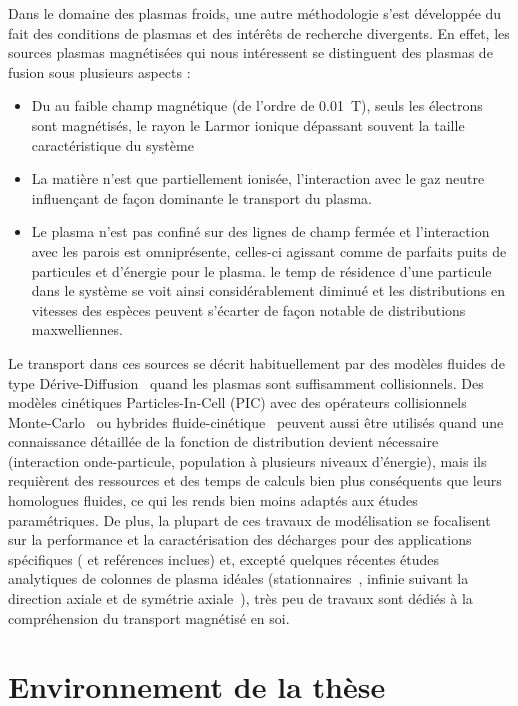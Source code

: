 \begin{refsection}
Dans le domaine des plasmas froids, une autre méthodologie s'est développée du
fait des conditions de plasmas et des intérêts de recherche
divergents. En effet, les sources plasmas magnétisées qui nous intéressent
se distinguent des plasmas de fusion sous plusieurs aspects :

\begin{itemize}
  \item Du au faible champ magnétique (de l'ordre de 0.01~T), seuls
  les électrons sont magnétisés, le rayon le Larmor ionique dépassant souvent la
  taille caractéristique du système
  \item La matière n'est que partiellement ionisée, l'interaction avec
  le gaz neutre influençant de façon dominante le transport du plasma.
  \item Le plasma n'est pas confiné sur des lignes de champ fermée et
  l'interaction avec les parois est omniprésente, celles-ci agissant comme de
  parfaits puits de particules et d'énergie pour le plasma.
  le temp de résidence d'une particule dans le système se voit
  ainsi considérablement diminué et les distributions en vitesses des
  espèces peuvent s'écarter de façon notable de distributions maxwelliennes.
\end{itemize}

Le transport dans ces sources se décrit habituellement par des modèles fluides
de type Dérive-Diffusion~\parencite{Porteous,Lieberman,Rozhansky} quand les
plasmas sont suffisamment collisionnels. Des modèles
cinétiques Particles-In-Cell (PIC) avec des opérateurs collisionnels
Monte-Carlo~\parencite{Claustre,Adam} ou hybrides
fluide-cinétique~\parencite{BoeufGarrigues} peuvent aussi être utilisés quand
une connaissance détaillée de la fonction de distribution devient nécessaire
(interaction onde-particule, population à plusieurs niveaux d'énergie), mais
ils requièrent des ressources et des temps de calculs bien plus conséquents que
leurs homologues fluides, ce qui les rends bien moins adaptés aux études
paramétriques. De plus, la plupart de ces travaux de modélisation se focalisent
sur la performance et la caractérisation des décharges pour des applications
spécifiques (\parencite{Lieberman} et reférences inclues) et, excepté quelques
récentes études analytiques de colonnes de plasma idéales
(stationnaires~\parencite{Sternberg}, infinie suivant la direction axiale et de
symétrie axiale~\parencite{Fruchtman}), très peu de travaux sont dédiés à la
compréhension du transport magnétisé en soi.


\section{Environnement de la thèse}


\end{refsection}
